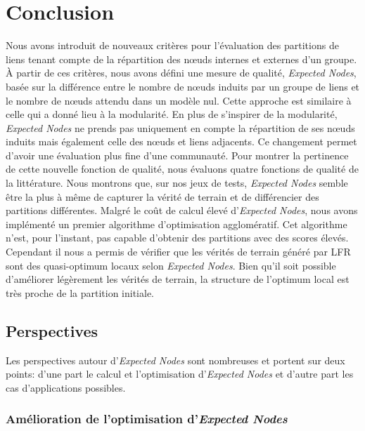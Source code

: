 \section{Conclusion}

Nous avons introduit de nouveaux critères pour l'évaluation des partitions de liens tenant compte de la répartition des n\oe uds internes et externes d'un groupe.
\`A partir de ces critères, nous avons défini une mesure de qualité, \emph{Expected Nodes}, basée sur la différence entre le nombre de n\oe uds induits par un groupe de liens et le nombre de n\oe uds attendu dans un modèle nul.
Cette approche est similaire à celle qui a donné lieu à la modularité.
En plus de s'inspirer de la modularité, \emph{Expected Nodes} ne prends pas uniquement en compte la répartition de ses n\oe uds induits mais également celle des n\oe uds et liens adjacents.
Ce changement permet d'avoir une évaluation plus fine d'une communauté.
Pour montrer la pertinence de cette nouvelle fonction de qualité, nous évaluons quatre fonctions de qualité de la littérature.
Nous montrons que, sur nos jeux de tests, \emph{Expected Nodes} semble être la plus à même de capturer la vérité de terrain et de différencier des partitions différentes.
Malgré le coût de calcul élevé d'\emph{Expected Nodes}, nous avons implémenté un premier algorithme d'optimisation agglomératif.
Cet algorithme n'est, pour l'instant, pas capable d'obtenir des partitions avec des scores élevés.
Cependant il nous a permis de vérifier que les vérités de terrain généré par LFR sont des quasi-optimum locaux selon \emph{Expected Nodes}.
Bien qu'il soit possible d'améliorer légèrement les vérités de terrain, la structure de l'optimum local est très proche de la partition initiale.


\subsection{Perspectives}

Les perspectives autour d'\emph{Expected Nodes} sont nombreuses et portent sur deux points: d'une part le calcul et l'optimisation d'\emph{Expected Nodes} et d'autre part les cas d'applications possibles.

\subsubsection{Amélioration de l'optimisation d'\emph{Expected Nodes}}


